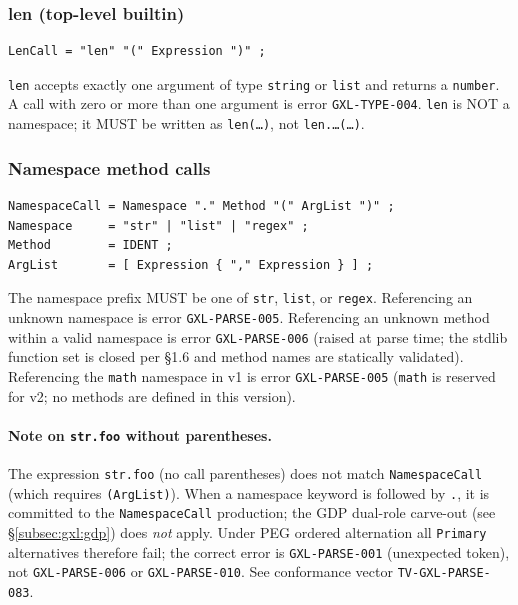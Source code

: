 \subsubsection{len (top-level builtin)}
\label{subsubsec:gxl:len-call}

\begin{verbatim}
LenCall = "len" "(" Expression ")" ;
\end{verbatim}

\texttt{len} accepts exactly one argument of type \texttt{string} or
\texttt{list} and returns a \texttt{number}.
A call with zero or more than one argument is error \texttt{GXL-TYPE-004}.
\texttt{len} is NOT a namespace; it MUST be written as \texttt{len(\ldots)},
not \texttt{len.\ldots(\ldots)}.

\subsubsection{Namespace method calls}
\label{subsubsec:gxl:ns-call}

\begin{verbatim}
NamespaceCall = Namespace "." Method "(" ArgList ")" ;
Namespace     = "str" | "list" | "regex" ;
Method        = IDENT ;
ArgList       = [ Expression { "," Expression } ] ;
\end{verbatim}

The namespace prefix MUST be one of \texttt{str}, \texttt{list}, or
\texttt{regex}.
Referencing an unknown namespace is error \texttt{GXL-PARSE-005}.
Referencing an unknown method within a valid namespace is error
\texttt{GXL-PARSE-006} (raised at parse time; the stdlib function set is
closed per \S1.6 and method names are statically validated).
Referencing the \texttt{math} namespace in v1 is error \texttt{GXL-PARSE-005}
(\texttt{math} is reserved for v2; no methods are defined in this version).

\paragraph{Note on \texttt{str.foo} without parentheses.}
The expression \texttt{str.foo} (no call parentheses) does not match
\texttt{NamespaceCall} (which requires \texttt{(ArgList)}).
When a namespace keyword is followed by \texttt{.}, it is committed to the
\texttt{NamespaceCall} production; the GDP dual-role carve-out (see
\S\ref{subsec:gxl:gdp}) does \emph{not} apply.
Under PEG ordered alternation all \texttt{Primary} alternatives therefore fail;
the correct error is \texttt{GXL-PARSE-001} (unexpected token), not
\texttt{GXL-PARSE-006} or \texttt{GXL-PARSE-010}.
See conformance vector \texttt{TV-GXL-PARSE-083}.

